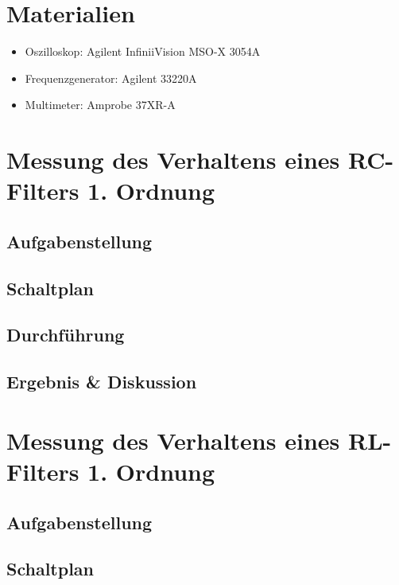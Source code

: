 \documentclass[12pt,a4paper,titlepage]{article}
\begin{document}
\setcounter{page}{2}

\newpage
\setcounter{tocdepth}{1}
\tableofcontents

\newpage

\section*{Materialien}
\begin{itemize}
	\item Oszilloskop: Agilent InfiniiVision MSO-X 3054A
	\item Frequenzgenerator: Agilent 33220A
  \item Multimeter: Amprobe 37XR-A
\end{itemize}

\section{Messung des Verhaltens eines RC-Filters 1. Ordnung}

\subsection{Aufgabenstellung}

\subsection{Schaltplan}

\subsection{Durchf\"uhrung}

\subsection{Ergebnis \& Diskussion}

\section{Messung des Verhaltens eines RL-Filters 1. Ordnung}

\subsection{Aufgabenstellung}

\subsection{Schaltplan}
\end{document}
